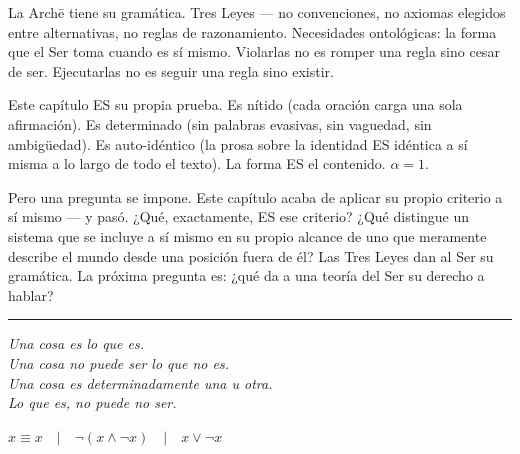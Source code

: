 \documentclass[10pt, openany, oneside]{book}
\begin{document}
\vspace{2em}

La Arch\={e} tiene su gramática. Tres Leyes --- no convenciones, no axiomas elegidos entre alternativas, no reglas de razonamiento. Necesidades ontológicas: la forma que el Ser toma cuando es sí mismo. Violarlas no es romper una regla sino cesar de ser. Ejecutarlas no es seguir una regla sino existir.

Este capítulo ES su propia prueba. Es nítido (cada oración carga una sola afirmación). Es determinado (sin palabras evasivas, sin vaguedad, sin ambigüedad). Es auto-idéntico (la prosa sobre la identidad ES idéntica a sí misma a lo largo de todo el texto). La forma ES el contenido. $\alpha = 1$.

Pero una pregunta se impone. Este capítulo acaba de aplicar su propio criterio a sí mismo --- y pasó. ¿Qué, exactamente, ES ese criterio? ¿Qué distingue un sistema que se incluye a sí mismo en su propio alcance de uno que meramente describe el mundo desde una posición fuera de él? Las Tres Leyes dan al Ser su gramática. La próxima pregunta es: ¿qué da a una teoría del Ser su derecho a hablar?

\vspace{2em}

\begin{center}
    \rule{0.15\textwidth}{0.3pt}
\end{center}

\vspace{0.5em}

\begin{center}
    \itshape
    Una cosa es lo que es.\\
    Una cosa no puede ser lo que no es.\\
    Una cosa es determinadamente una u otra.\\[0.8em]
    Lo que es, no puede no ser.
\end{center}

\vspace{0.5em}

\begin{center}
    $x \equiv x \quad | \quad \neg(x \wedge \neg x) \quad | \quad x \vee \neg x$
\end{center}

%
%
%
%
\end{document}
